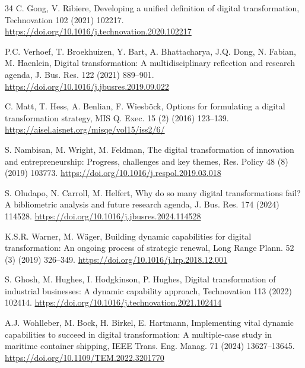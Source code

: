 \documentclass[preprint,12pt]{elsarticle}
\begin{document}
{\begin{thebibliography}{34}
C. Gong, V. Ribiere, Developing a unified definition of digital transformation, Technovation 102 (2021) 102217. \newline\url{https://doi.org/10.1016/j.technovation.2020.102217}

P.C. Verhoef, T. Broekhuizen, Y. Bart, A. Bhattacharya, J.Q. Dong, N. Fabian, M. Haenlein, Digital transformation: A multidisciplinary reflection and research agenda, J. Bus. Res. 122 (2021) 889--901. \newline\url{https://doi.org/10.1016/j.jbusres.2019.09.022}

C. Matt, T. Hess, A. Benlian, F. Wiesb\"ock, Options for formulating a digital transformation strategy, MIS Q. Exec. 15 (2) (2016) 123--139. \newline\url{https://aisel.aisnet.org/misqe/vol15/iss2/6/}

S. Nambisan, M. Wright, M. Feldman, The digital transformation of innovation and entrepreneurship: Progress, challenges and key themes, Res. Policy 48 (8) (2019) 103773. \newline\url{https://doi.org/10.1016/j.respol.2019.03.018}

S. Oludapo, N. Carroll, M. Helfert, Why do so many digital transformations fail? A bibliometric analysis and future research agenda, J. Bus. Res. 174 (2024) 114528. \newline\url{https://doi.org/10.1016/j.jbusres.2024.114528}

K.S.R. Warner, M. W\"ager, Building dynamic capabilities for digital transformation: An ongoing process of strategic renewal, Long Range Plann. 52 (3) (2019) 326--349. \newline\url{https://doi.org/10.1016/j.lrp.2018.12.001}

S. Ghosh, M. Hughes, I. Hodgkinson, P. Hughes, Digital transformation of industrial businesses: A dynamic capability approach, Technovation 113 (2022) 102414. \newline\url{https://doi.org/10.1016/j.technovation.2021.102414}

A.J. Wohlleber, M. Bock, H. Birkel, E. Hartmann, Implementing vital dynamic capabilities to succeed in digital transformation: A multiple-case study in maritime container shipping, IEEE Trans. Eng. Manag. 71 (2024) 13627--13645. \newline\url{https://doi.org/10.1109/TEM.2022.3201770}


\end{thebibliography}}
\end{document}
